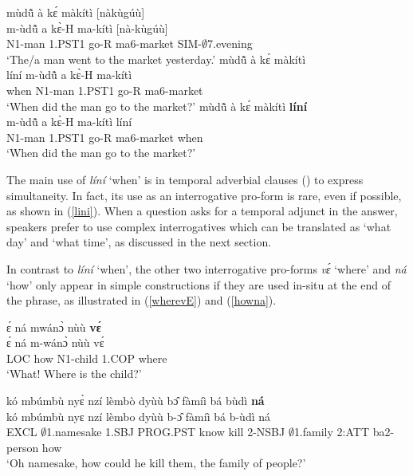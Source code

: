 \begin{exe}
\ex\label{lini}
\begin{xlist}
\ex \label{lini1}
  \glll    mùdũ̂ à kɛ́ màkítì [nàkùgúù] \\
      m-ùdũ̂ a kɛ̀-H ma-kítì [nà-kùgúù] \\
              N1-man 1.PST1 go-R ma6-market SIM-$\emptyset$7.evening \\
   \trans `The/a man went to the market yesterday.'
\ex\label{lini2}
  mùdũ̂ à kɛ́ màkítì  \\
           líní m-ùdũ̂ a kɛ̀-H ma-kítì\\
             when N1-man 1.PST1 go-R ma6-market \\
    \trans `When did the man go to the market?'
\ex\label{lini3}
 \glll     mùdũ̂ à kɛ́ màkítì {\bfseries líní} \\
            m-ùdũ̂ a kɛ̀-H ma-kítì líní\\
              N1-man 1.PST1 go-R ma6-market when \\
    \trans `When did the man go to the market?'
\end {xlist}
\end {exe}

 The main use of {\itshape líní} `when' is in temporal adverbial clauses () to express simultaneity. In fact, its use as an interrogative pro-form is rare, even if possible, as shown in (\ref{lini}). When a question asks for a temporal adjunct in the answer, speakers prefer to use complex interrogatives which can be translated as `what day' and `what time', as discussed in the next section. 

In contrast to {\itshape líní} `when', the other two interrogative pro-forms {\itshape vɛ́} `where' and {\itshape ná} `how' only appear in simple constructions if they are used in-situ at the end of the phrase, as illustrated in (\ref{wherevE}) and (\ref{howna}).

\begin{exe} 
\ex\label{wherevE}
  \glll ɛ́ ná mwánɔ̀ nùù {\bfseries vɛ́} \\
       ɛ́ ná m-wánɔ̀ nùù vɛ́ \\
       LOC how N1-child 1.COP where  \\
    \trans `What! Where is the child?'
\end{exe}


\begin{exe} 
\ex\label{howna}
  \glll kó mbúmbù nyɛ̀ nzí lèmbò dyùù bɔ̂ fàmíì bá bùdì {\bfseries ná} \\
       kó mbúmbù nyɛ nzí lèmbo dyùù b-ɔ̂ fàmíì bá b-ùdì ná \\
       EXCL $\emptyset$1.namesake 1.SBJ PROG.PST know kill 2-NSBJ $\emptyset$1.family 2:ATT ba2-person how \\
    \trans `Oh namesake, how could he kill them, the family of people?'
\end{exe}

